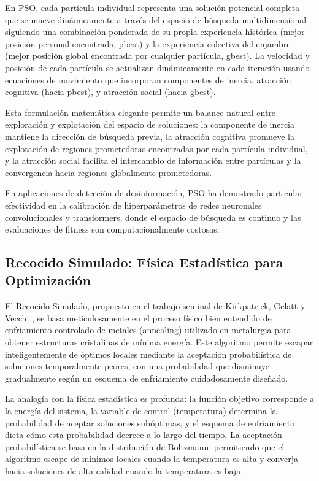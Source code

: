 En PSO, cada partícula individual representa una solución potencial completa que se mueve dinámicamente a través del espacio de búsqueda multidimensional siguiendo una combinación ponderada de su propia experiencia histórica (mejor posición personal encontrada, pbest) y la experiencia colectiva del enjambre (mejor posición global encontrada por cualquier partícula, gbest). La velocidad y posición de cada partícula se actualizan dinámicamente en cada iteración usando ecuaciones de movimiento que incorporan componentes de inercia, atracción cognitiva (hacia pbest), y atracción social (hacia gbest).

Esta formulación matemática elegante permite un balance natural entre exploración y explotación del espacio de soluciones: la componente de inercia mantiene la dirección de búsqueda previa, la atracción cognitiva promueve la explotación de regiones prometedoras encontradas por cada partícula individual, y la atracción social facilita el intercambio de información entre partículas y la convergencia hacia regiones globalmente prometedoras.

En aplicaciones de detección de desinformación, PSO ha demostrado particular efectividad en la calibración de hiperparámetros de redes neuronales convolucionales y transformers, donde el espacio de búsqueda es continuo y las evaluaciones de fitness son computacionalmente costosas.

\subsection{Recocido Simulado: Física Estadística para Optimización}

El Recocido Simulado, propuesto en el trabajo seminal de Kirkpatrick, Gelatt y Vecchi \cite{kirkpatrick1983optimization}, se basa meticulosamente en el proceso físico bien entendido de enfriamiento controlado de metales (annealing) utilizado en metalurgia para obtener estructuras cristalinas de mínima energía. Este algoritmo permite escapar inteligentemente de óptimos locales mediante la aceptación probabilística de soluciones temporalmente peores, con una probabilidad que disminuye gradualmente según un esquema de enfriamiento cuidadosamente diseñado.

La analogía con la física estadística es profunda: la función objetivo corresponde a la energía del sistema, la variable de control (temperatura) determina la probabilidad de aceptar soluciones subóptimas, y el esquema de enfriamiento dicta cómo esta probabilidad decrece a lo largo del tiempo. La aceptación probabilística se basa en la distribución de Boltzmann, permitiendo que el algoritmo escape de mínimos locales cuando la temperatura es alta y converja hacia soluciones de alta calidad cuando la temperatura es baja.

